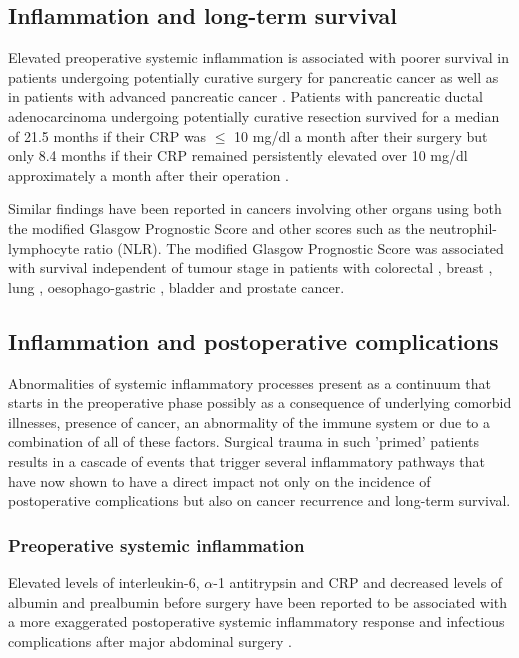 \subsection{Inflammation and long-term survival}
Elevated preoperative systemic inflammation is associated with poorer survival in patients undergoing potentially curative surgery for pancreatic cancer \parencite{jamieson_systemic_2005, clark_preoperative_2007, bhatti_preoperative_2010} as well as in patients with advanced pancreatic cancer \parencite{glen_evaluation_2006}. 
Patients with pancreatic ductal adenocarcinoma undergoing potentially curative resection survived for a median of 21.5 months if their CRP was $\leq$ 10 mg/dl a month after their surgery but only 8.4 months if their CRP remained persistently elevated over 10 mg/dl approximately a month after their operation \parencite{jamieson_systemic_2005}. 

Similar findings have been reported in cancers involving other organs using both the modified Glasgow Prognostic Score and other scores such as the neutrophil-lymphocyte ratio (NLR). 
The modified Glasgow Prognostic Score was associated with survival independent of tumour stage in patients with colorectal \parencite{mcmillan_evaluation_2007, leitch_comparison_2007}, breast \parencite{al_murri_evaluation_2006, al_murri_evaluation_2007}, lung \parencite{forrest_comparison_2004}, oesophago-gastric \parencite{crumley_elevated_2006}, bladder \parencite{hilmy_relationship_2006} and prostate \parencite{mcardle_systemic_2006} cancer.


\subsection{Inflammation and postoperative complications}
Abnormalities of systemic inflammatory processes present as a continuum that starts in the preoperative phase possibly as a consequence of underlying comorbid illnesses, presence of cancer, an abnormality of the immune system or due to a combination of all of these factors. 
Surgical trauma in such 'primed' patients results in a cascade of events that trigger several inflammatory pathways that have now shown to have a direct impact not only on the incidence of postoperative complications but also on cancer recurrence and long-term survival.

\subsubsection{Preoperative systemic inflammation}
Elevated levels of interleukin-6, $\alpha$-1 antitrypsin and CRP and decreased levels of albumin and prealbumin before surgery have been reported to be associated with a more exaggerated postoperative systemic inflammatory response and infectious complications after major abdominal surgery \parencite{haupt_association_1997}. 

